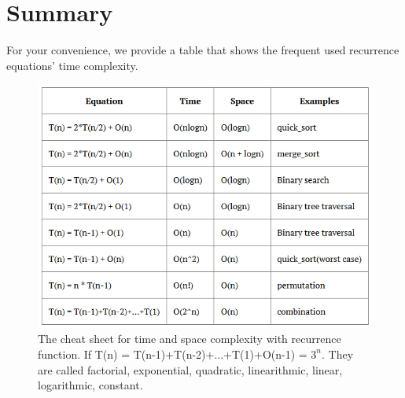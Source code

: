 \documentclass[../main.tex]{subfiles}
\begin{document}
\section{Summary}
For your convenience, we provide a table that shows the frequent used recurrence equations' time complexity. 
\begin{figure}[h]
    \centering
    \includegraphics[width=1\columnwidth] {fig/complexity_cheatsheet.png}
    \caption{The cheat sheet for time and space complexity with recurrence function. If T(n) = T(n-1)+T(n-2)+...+T(1)+O(n-1) = $3^n$. They are called factorial, exponential, quadratic, linearithmic, linear, logarithmic, constant. }
    \label{fig:cheat_sheet}
\end{figure}

    
        
\end{document}

